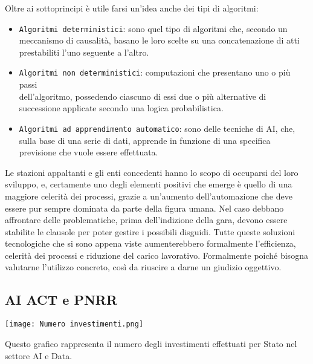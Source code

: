 \documentclass{article}
\begin{document}
\begin{justify}
\begin{itemize}
    \end{itemize}
    Oltre ai sottoprincipi è utile farsi un'idea anche dei tipi di algoritmi:
    \begin{itemize}
        \item \texttt{Algoritmi deterministici}: sono quel tipo di algoritmi che, secondo un meccanismo di causalità, basano le loro scelte su una concatenazione di atti prestabiliti l'uno seguente a l'altro.
        \item \texttt{Algoritmi non deterministici}: computazioni che presentano uno o più passi\\ dell'algoritmo, possedendo ciascuno di essi due o più alternative di successione applicate secondo una logica probabilistica.
        \item \texttt{Algoritmi ad apprendimento automatico}: sono delle tecniche di AI, che, sulla base di una serie di dati, apprende in funzione di una specifica previsione che vuole essere effettuata.
    \end{itemize}
    Le stazioni appaltanti e gli enti concedenti hanno lo scopo di occuparsi del loro sviluppo, e, certamente uno degli elementi positivi che emerge è quello di una maggiore celerità dei processi, grazie a un'aumento dell'automazione che deve essere pur sempre dominata da parte della figura umana. Nel caso debbano affrontare delle problematiche, prima dell'indizione della gara, devono essere stabilite le clausole per poter gestire i possibili disguidi.
    Tutte queste soluzioni tecnologiche che si sono appena viste aumenterebbero formalmente l'efficienza, celerità dei processi e riduzione del carico lavorativo. Formalmente poiché bisogna valutarne l'utilizzo concreto, così da riuscire a darne un giudizio oggettivo.
\end{justify}

\subsection{AI ACT e PNRR}
\begin{center}
    \texttt{[image: Numero investimenti.png]}
\end{center}
\begin{center}
    Questo grafico rappresenta il numero degli investimenti effettuati per Stato nel settore AI e Data.\citep{OECD_AI}
\end{center}
\end{document}

